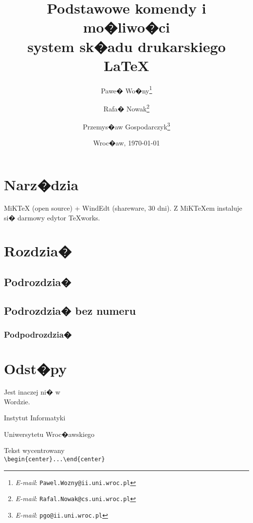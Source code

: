 \documentclass[11pt,wide]{mwart}
\date{Wroc�aw, \today}
\title{\LARGE\textbf{Podstawowe komendy i mo�liwo�ci}\\system sk�adu drukarskiego \LaTeX}
\author{Pawe� Wo�ny\thanks{\textit{E-mail}: \texttt{Pawel.Wozny@ii.uni.wroc.pl}}%
	    \and
		Rafa� Nowak\thanks{\textit{E-mail}: \texttt{Rafal.Nowak@cs.uni.wroc.pl}}
        \and
        Przemys�aw Gospodarczyk\thanks{\textit{E-mail}: \texttt{pgo@ii.uni.wroc.pl}}}
\begin{document}
\maketitle                %
\thispagestyle{empty}     %
\tableofcontents          %

\section{Narz�dzia}

\noindent MiKTeX (open source) + WindEdt (shareware, 30 dni). Z MiKTeXem instaluje si� darmowy edytor TeXworks.

\section{Rozdzia�}

\subsection{Podrozdzia�}
\subsection*{Podrozdzia� bez numeru}

\subsubsection{Podpodrozdzia�}


\section{Odst�py}
Jest          inaczej ni� w\\
Wordzie.\newline\newline


\noindent Instytut\hspace{4.75cm} Informatyki

\vspace{1cm}






\hspace{1cm} Uniwersytetu Wroc�awskiego



\begin{center}
Tekst wycentrowany\\
\verb+\begin{center}...\end{center}+
\end{center}
\end{document}
